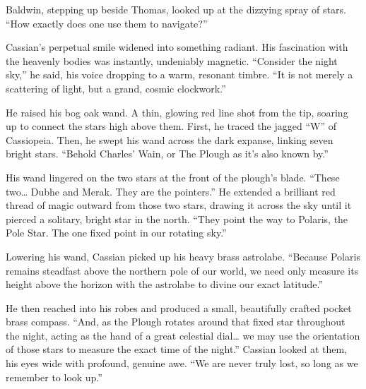 Baldwin, stepping up beside Thomas, looked up at the dizzying spray of stars. \enquote{How exactly does one use them to navigate?}

Cassian's perpetual smile widened into something radiant. His fascination with the heavenly bodies was instantly, undeniably magnetic. \enquote{Consider the night sky,} he said, his voice dropping to a warm, resonant timbre. \enquote{It is not merely a scattering of light, but a grand, cosmic clockwork.}

He raised his bog oak wand. A thin, glowing red line shot from the tip, soaring up to connect the stars high above them. First, he traced the jagged \enquote{W} of Cassiopeia. Then, he swept his wand across the dark expanse, linking seven bright stars. \enquote{Behold Charles' Wain, or The Plough as it's also known by.}

His wand lingered on the two stars at the front of the plough's blade. \enquote{These two\ldots{} Dubhe and Merak. They are the pointers.} He extended a brilliant red thread of magic outward from those two stars, drawing it across the sky until it pierced a solitary, bright star in the north. \enquote{They point the way to Polaris, the Pole Star. The one fixed point in our rotating sky.}

Lowering his wand, Cassian picked up his heavy brass astrolabe. \enquote{Because Polaris remains steadfast above the northern pole of our world, we need only measure its height above the horizon with the astrolabe to divine our exact latitude.}

He then reached into his robes and produced a small, beautifully crafted pocket brass compass. \enquote{And, as the Plough rotates around that fixed star throughout the night, acting as the hand of a great celestial dial\ldots{} we may use the orientation of those stars to measure the exact time of the night.} Cassian looked at them, his eyes wide with profound, genuine awe. \enquote{We are never truly lost, so long as we remember to look up.}
